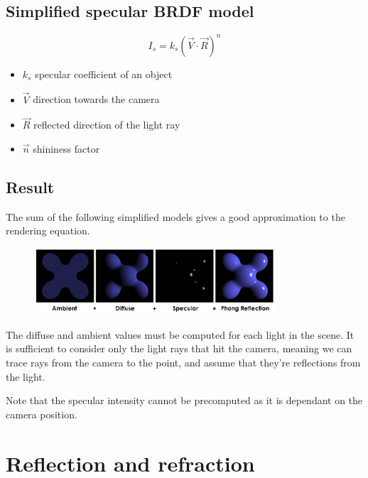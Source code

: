 \documentclass[a4paper]{article}
\begin{document}
\subsection{Simplified specular BRDF model}

\[
    I_s=k_s {(\vec{V} \cdot \vec{R})}^n
\]

\begin{itemize}
    \item \(k_s\) specular coefficient of an object
    \item \(\vec{V}\) direction towards the camera
    \item \(\vec{R}\) reflected direction of the light ray
    \item \(\vec{n}\) shininess factor
\end{itemize}

\pagebreak

\subsection{Result}

The sum of the following simplified models
gives a good approximation to the rendering equation.

\begin{figure}[h]
    \centering
    \includegraphics[width=0.8\textwidth]{resources/phong.png}
\end{figure}

The diffuse and ambient values must be computed for each light in the scene.
It is sufficient to consider only the light rays that hit the camera, meaning
we can trace rays from the camera to the point, and assume that they're reflections
from the light.

Note that the specular intensity cannot be precomputed as it is dependant
on the camera position.

\pagebreak

\section{Reflection and refraction}
\end{document}
